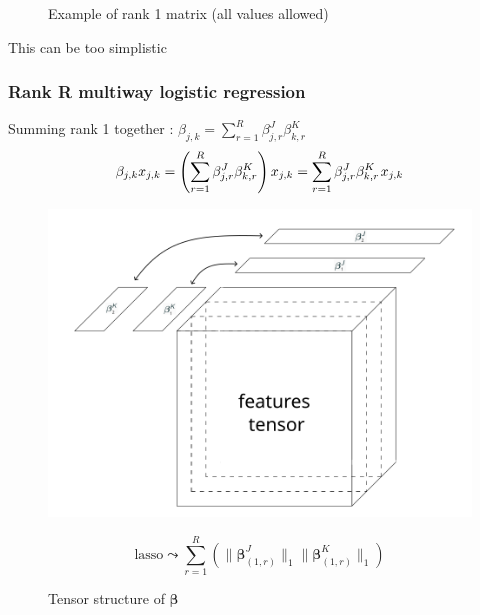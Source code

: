 \documentclass{beamer}
\begin{document}
\begin{frame}
\begin{figure}
\begin{minipage}{0.4\textwidth}
            \caption{\centering Example of rank 1 matrix (all values allowed)}
        \end{minipage}
    \end{figure}
    \begin{center}
        \vspace{5 pt}
        This can be too simplistic
    \end{center}


\end{frame}

\begin{frame}
    \frametitle{Rank R multiway logistic regression \cite{multi_rank_r}}
    \hspace{50 pt}Summing rank 1 together : $\beta_{j,k} = \sum\limits_{r = 1}^R \beta_{j,r}^J\beta_{k,r}^K$\\
    $$\beta_{j,k}x_{j,k} = \left( \sum\limits_{r = 1}^R \beta_{j,r}^J\beta_{k,r}^K \right) x_{j,k} = \sum\limits_{r = 1}^R \beta_{j,r}^J\beta_{k,r}^K \hspace{1 pt} x_{j,k}$$
    \vspace{-10 pt}
\begin{figure}
    \centering
    \begin{minipage}{0.5\textwidth}
        \centering
        \includegraphics[scale=0.25]{images/beta_tens_R.png}
        \caption{Tensor structure of $\bm{\beta}$}
    \end{minipage}
    \hfill
    \begin{minipage}{0.45\textwidth}
        \centering
        \[
        \text{lasso} \leadsto  \sum\limits_{r = 1}^R \left( \lVert \bm{\beta}_{(1,r)}^J \rVert_1 \lVert \bm{\beta}_{(1,r)}^K \rVert_1 \right)
        \]
    \end{minipage}
\end{figure}
\end{frame}
\end{document}

